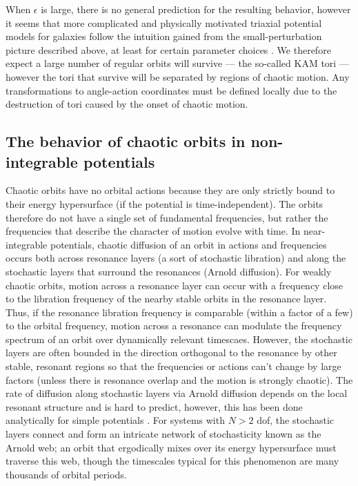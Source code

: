 \documentclass[letterpaper,12pt,preprint]{aastex}
\begin{document}
When $\epsilon$ is large, there is no general prediction for the resulting behavior, however it seems that more complicated and physically motivated triaxial potential models for galaxies follow the intuition gained from the small-perturbation picture described above, at least for certain parameter choices \citep{valluri, merritt, dehnen, etc.}. We therefore expect a large number of regular orbits will survive --- the so-called KAM tori --- however the tori that survive will be separated by regions of chaotic motion. Any transformations to angle-action coordinates must be defined locally due to the destruction of tori caused by the onset of chaotic motion. 

\subsection{The behavior of chaotic orbits in non-integrable potentials}\label{sec:behavior-chaotic}

Chaotic orbits have no orbital actions because they are only strictly bound to their energy hypersurface (if the potential is time-independent). The orbits therefore do not have a single set of fundamental frequencies, but rather the frequencies that describe the character of motion evolve with time. In near-integrable potentials, chaotic diffusion of an orbit in actions and frequencies occurs both across resonance layers (a sort of stochastic libration) and along the stochastic layers that surround the resonances (Arnold diffusion). For weakly chaotic orbits, motion across a resonance layer can occur with a frequency close to the libration frequency of the nearby stable orbits in the resonance layer. Thus, if the resonance libration frequency is comparable (within a factor of a few) to the orbital frequency, motion across a resonance can modulate the frequency spectrum of an orbit over dynamically relevant timescaes. However, the stochastic layers are often bounded in the direction orthogonal to the resonance by other stable, resonant regions so that the frequencies or actions can't change by large factors (unless there is resonance overlap and the motion is strongly chaotic). The rate of diffusion along stochastic layers via Arnold diffusion depends on the local resonant structure and is hard to predict, however, this has been done analytically for simple potentials \citep[e.g.,][]{chirikov??}. For systems with $N>2$ dof, the stochastic layers connect and form an intricate network of stochasticity known as the Arnold web; an orbit that ergodically mixes over its energy hypersurface must traverse this web, though the timescales typical for this phenomenon are many thousands of orbital periods.
\end{document}
